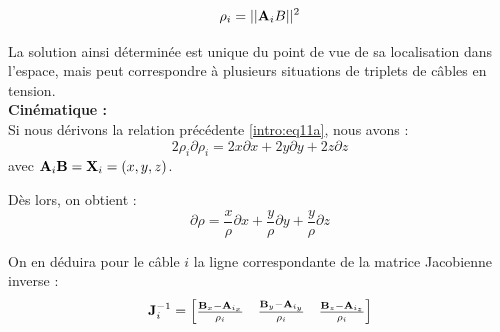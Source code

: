 \begin{equation}
\rho_i = ||{\bf A}_iB||^2
\label{intro:eq11a}
\end{equation}

La solution ainsi d\'etermin\'ee est unique du point de vue de sa localisation 
dans l'espace, mais peut correspondre \`a plusieurs situations de triplets de 
c\^ables en tension.\\

{\bf Cin\'ematique :}\\

Si nous d\'erivons la relation pr\'ec\'edente \ref{intro:eq11a}, nous avons :
\begin{equation}
2 \rho_i \partial \rho_i = 2 x \partial x + 2 y \partial y + 2 z \partial z
\label{intro:eq11a2}
\end{equation}
avec ${\bf A}_i{\bf B} = {\bf X}_i = (x, y, z)$.

D\`es lors, on obtient :
\begin{equation}
\partial \rho = \frac x \rho \partial x + \frac y \rho \partial y + \frac y 
\rho \partial z
\label{intro:eq11a3}
\end{equation}

On en d\'eduira pour le c\^able $i$ la ligne correspondante de la 
matrice Jaco\-bienne inverse :
\begin{equation}
{\bf J}^{-1}_i = 
\begin{bmatrix}
\frac {{\bf B}_x - {\bf A}_{i_x}} {\rho_i} & \frac {{\bf B}_y - {\bf A}_{i_y}} 
{\rho_i} & \frac {{\bf B}_z - {\bf A}_{i_z}} {\rho_i} 
\end{bmatrix}
\label{intro:eq11a4}
\end{equation}





\vfill